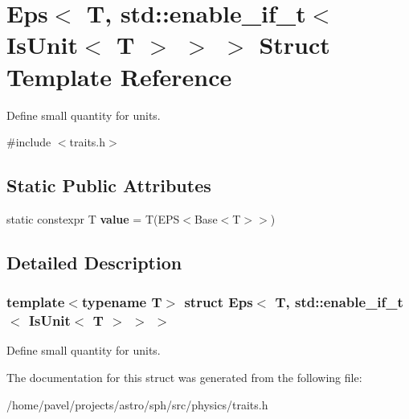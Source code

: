 \hypertarget{structEps_3_01T_00_01std_1_1enable__if__t_3_01IsUnit_3_01T_01_4_01_4_01_4}{}\section{Eps$<$ T, std\+:\+:enable\+\_\+if\+\_\+t$<$ Is\+Unit$<$ T $>$ $>$ $>$ Struct Template Reference}
\label{structEps_3_01T_00_01std_1_1enable__if__t_3_01IsUnit_3_01T_01_4_01_4_01_4}


Define small quantity for units.  




{\ttfamily \#include $<$traits.\+h$>$}

\subsection*{Static Public Attributes}
\begin{DoxyCompactItemize}
\item 
\hypertarget{structEps_3_01T_00_01std_1_1enable__if__t_3_01IsUnit_3_01T_01_4_01_4_01_4_a16afef77493e7733c82bbffeb8f158d2}{}\label{structEps_3_01T_00_01std_1_1enable__if__t_3_01IsUnit_3_01T_01_4_01_4_01_4_a16afef77493e7733c82bbffeb8f158d2} 
static constexpr T {\bfseries value} = T(E\+PS$<$Base$<$T$>$$>$)
\end{DoxyCompactItemize}


\subsection{Detailed Description}
\subsubsection*{template$<$typename T$>$\newline
struct Eps$<$ T, std\+::enable\+\_\+if\+\_\+t$<$ Is\+Unit$<$ T $>$ $>$ $>$}

Define small quantity for units. 

The documentation for this struct was generated from the following file\+:\begin{DoxyCompactItemize}
\item 
/home/pavel/projects/astro/sph/src/physics/traits.\+h\end{DoxyCompactItemize}
